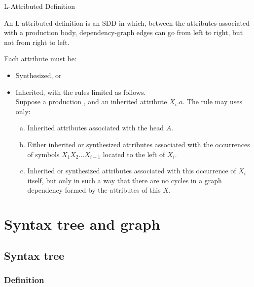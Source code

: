 \begin{bibunit}[apalike]
\begin{frame}{L-Attributed Definition}
	\begin{footnotesize}
	\begin{definition}
		An L-attributed definition is an SDD in which, between the attributes associated with a production body, dependency-graph edges can go from left to right, but not from right to left.
	\end{definition}
	Each attribute must be:
	\begin{itemize}
	\item Synthesized, or
	\item Inherited, with the rules limited as follows. \\
		Suppose a production , and an inherited attribute $X_i.a$. The rule may uses only:
		\begin{enumerate}[a)]\footnotesize
		\item Inherited attributes associated with the head $A$.
		\item Either inherited or synthesized attributes associated with the occurrences of symbols $X_1 X_2 \dots X_{i-1}$ located to the left of $X_i$.
		\item Inherited or synthesized attributes associated with this occurrence of $X_i$ itself, but only in such a way that there are no cycles in a graph dependency formed by the attributes of this $X$.
		\end{enumerate}
	\end{itemize}
	\end{footnotesize}
\end{frame}

\section{Syntax tree and graph}

\tableofcontentslide[sections={1-6},sectionstyle={show/shaded},subsectionstyle={show/show/hide},subsubsectionstyle={hide/hide/hide/hide}]

\subsection{Syntax tree}

\subsubsection{Definition}


\end{bibunit}
